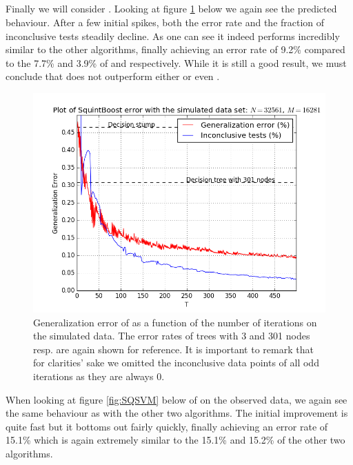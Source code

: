 \subsection{\squintB}
\label{subsec:sqPracPerf}
Finally we will consider \squintB. Looking at figure \ref{fig:SQGD} below we again see the predicted behaviour. After a few initial spikes, both the error rate and the fraction of inconclusive tests steadily decline. As one can see it indeed performs incredibly similar to the other algorithms, finally achieving an error rate of 9.2\% compared to the 7.7\% and 3.9\% of \adaB and \NHB respectively. While it is still a good result, we must conclude that \squintB does not outperform either \NHB or even \adaB. 
\begin{figure}[!ht]
  \centering
     \includegraphics[width=\graphWidth]{generated/SQGD.png}
  \caption{Generalization error of \squintB as a function of the number of iterations on the simulated data. The error rates of trees with 3 and 301 nodes resp. are again shown for reference. It is important to remark that for clarities' sake we omitted the inconclusive data points of all odd iterations as they are always 0.}
      \label{fig:SQGD}
\end{figure}

\par When looking at figure \ref{fig:SQSVM} below of \squintB on the observed data, we again see the same behaviour as with the other two algorithms. The initial improvement is quite fast but it bottoms out fairly quickly, finally achieving an error rate of 15.1\% which is again extremely similar to the 15.1\% and 15.2\% of the other two algorithms. 


